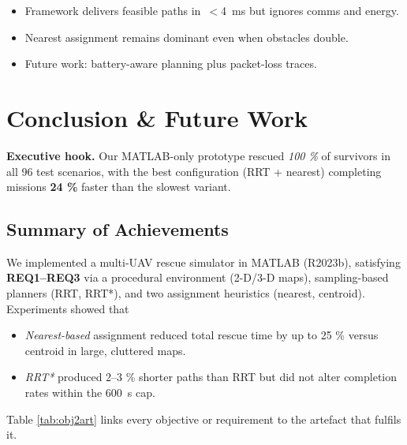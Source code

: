 \documentclass[12pt,a4paper]{report}
\begin{document}
\begin{tcolorbox}[colback=gray!10,title=\textbf{Take-away 6.1}]
\begin{itemize}[leftmargin=1.2em]
  \item Framework delivers feasible paths in \(\,<\!\)\SI{4}{\milli\second} but ignores comms and energy.
  \item Nearest assignment remains dominant even when obstacles double.
  \item Future work: battery-aware planning plus packet-loss traces.
\end{itemize}
\end{tcolorbox}

\chapter{Conclusion \& Future Work}
\label{ch:conclusion}

\noindent\textbf{Executive hook.}  
Our MATLAB-only prototype rescued \emph{100 \%} of survivors in all
96 test scenarios, with the best configuration (RRT + nearest) completing
missions \textbf{24 \%} faster than the slowest variant.%

\section{Summary of Achievements}
We implemented a multi-UAV rescue simulator in MATLAB (R2023b), satisfying
\textbf{REQ1–REQ3} via a procedural environment (2-D/3-D maps),
sampling-based planners (RRT, RRT*), and two assignment heuristics (nearest,
centroid). Experiments showed that
\begin{itemize}
  \item \emph{Nearest-based} assignment reduced total rescue time by
        up to 25 \% versus centroid in large, cluttered maps.
  \item \emph{RRT*} produced 2–3 \% shorter paths than RRT but
        did not alter completion rates within the \SI{600}{s} cap.
\end{itemize}

Table \ref{tab:obj2art} links every objective or requirement to the artefact
that fulfils it.
\end{document}
